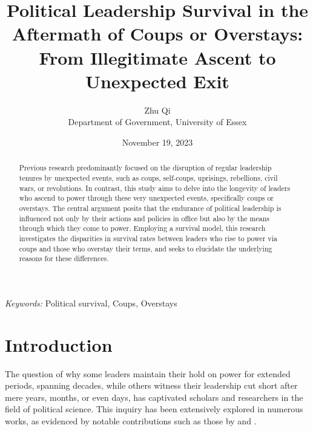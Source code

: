 \documentclass[
  12pt,
  a4paper,
  12pt]{article}
\begin{document}
\def\spacingset#1{\renewcommand{\baselinestretch}%
{#1}\small\normalsize} \spacingset{1}



\date{November 19, 2023}
\title{\bf Political Leadership Survival in the Aftermath of Coups or
Overstays: From Illegitimate Ascent to Unexpected Exit}
\author{
Zhu Qi\\
Department of Government, University of Essex\\
}
\maketitle

\bigskip
\bigskip
\begin{abstract}
Previous research predominantly focused on the disruption of regular
leadership tenures by unexpected events, such as coups, self-coups,
uprisings, rebellions, civil wars, or revolutions. In contrast, this
study aims to delve into the longevity of leaders who ascend to power
through these very unexpected events, specifically coups or overstays.
The central argument posits that the endurance of political leadership
is influenced not only by their actions and policies in office but also
by the means through which they come to power. Employing a survival
model, this research investigates the disparities in survival rates
between leaders who rise to power via coups and those who overstay their
terms, and seeks to elucidate the underlying reasons for these
differences.
\end{abstract}

\noindent%
{\it Keywords:} Political survival, Coups, Overstays
\vfill

\newpage
\spacingset{1.9} %
\ifdefined\Shaded\renewenvironment{Shaded}{\begin{tcolorbox}[frame hidden, sharp corners, boxrule=0pt, borderline west={3pt}{0pt}{shadecolor}, interior hidden, breakable, enhanced]}{\end{tcolorbox}}\fi

\hypertarget{introduction}{%
\section{Introduction}\label{introduction}}

The question of why some leaders maintain their hold on power for
extended periods, spanning decades, while others witness their
leadership cut short after mere years, months, or even days, has
captivated scholars and researchers in the field of political science.
This inquiry has been extensively explored in numerous works, as
evidenced by notable contributions such as those by
\citet{clinton1975politics} and \citet{buenodemesquita2003}.
\end{document}
